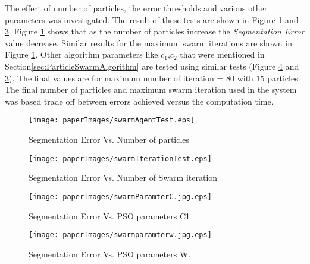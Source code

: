 	 	
 The effect of number of particles, the error thresholds and various other parameters was investigated. The result of these tests are shown in Figure \ref{fig:swarmtesting} and \ref{fig:swarmtesting2}. Figure \ref{fig:swarmtesting} shows that as the number of particles increase the \textit{Segmentation Error} value decrease. Similar results for the maximum swarm iterations are shown in Figure \ref{fig:swarmtesting}. Other algorithm parameters like $c_1$,$c_2$ that were mentioned in Section\ref{sec:ParticleSwarmAlgorithm} are tested using similar tests (Figure \ref{fig:swarmparamterw.jpg} and \ref{fig:swarmtesting2}). The final values are for maximum number of iteration = 80 with 15 particles. The final number of particles and maximum swarm iteration used in the system was based trade off between errors achieved versus the computation time. 
   
   
    
 \begin{figure}
	\centering		
	 \texttt{[image: paperImages/swarmAgentTest.eps]}
	 	\caption{Segmentation Error Vs. Number of particles}
	 	\label{fig:swarmtesting}
\end{figure} 
\begin{figure}
	\centering
		\texttt{[image: paperImages/swarmIterationTest.eps]}
	\caption{Segmentation Error Vs. Number of Swarm iteration}
	\label{fig:swarmIterationTest}
\end{figure}

\begin{figure}
	\centering		
	 \texttt{[image: paperImages/swarmParamterC.jpg.eps]}
	 	\caption{Segmentation Error Vs. PSO parameters C1}
	 	\label{fig:swarmtesting2}
	
\end{figure} 


\begin{figure}
	\centering
		\texttt{[image: paperImages/swarmparamterw.jpg.eps]}
	\caption{Segmentation Error Vs. PSO parameters W.}
	\label{fig:swarmparamterw.jpg}
\end{figure}



